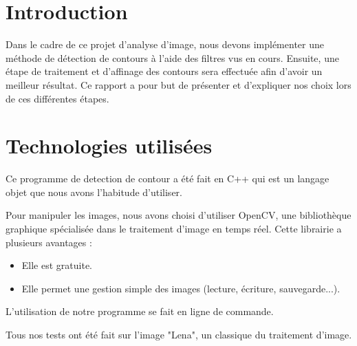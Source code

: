 \documentclass[11pt]{article}
\author{\fontsize{14}{14}{Aurélien CHEMIER 10908892 et Romane LHOMME 11006689}}
\title{\fontsize{16}{16}{{\bf Analyse, aquisition et traitement d’image \\ TP1}}}
\date{\fontsize{11}{11}{\today}}
\begin{document}
\thispagestyle{empty}
\maketitle

\newpage
\tableofcontents
\newpage

\section{Introduction}

	Dans le cadre de ce projet d’analyse d’image, nous devons implémenter une méthode de détection de contours à l’aide des filtres vus en cours. 
	Ensuite, une étape de traitement et d'affinage des contours  sera effectuée afin d'avoir un meilleur résultat.
	Ce rapport a pour but de présenter et d'expliquer nos choix lors de ces différentes étapes.

	\section{Technologies utilisées}

	Ce programme de detection de contour a été fait en C++ qui est un langage objet que nous avons l'habitude d'utiliser.

	Pour manipuler les images, nous avons choisi d'utiliser OpenCV, une bibliothèque graphique spécialisée dans le traitement d'image en temps réel.
	Cette librairie a plusieurs avantages :
	\begin{itemize}
		\item Elle est gratuite.
		\item Elle permet une gestion simple des images (lecture, écriture, sauvegarde...).
	\end{itemize}

	L'utilisation de notre programme se fait en ligne de commande.

	Tous nos tests ont été fait sur l'image "Lena", un classique du traitement d'image.
\end{document}
